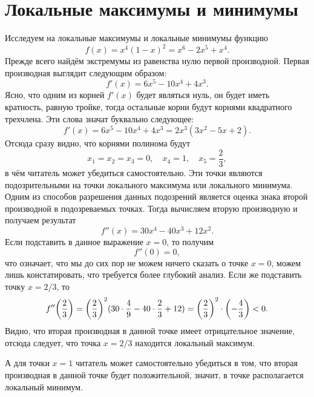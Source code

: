 \documentclass[12pt]{article}
\begin{document}
\section{Локальные максимумы и минимумы} %
\label{sec:6}
Исследуем на локальные максимумы и локальные минимумы функцию 
\begin{equation}
	f(x) = x^4(1-x)^2 = x^6-2x^5+x^4.
\end{equation}
Прежде всего найдём экстремумы из равенства нулю первой производной. Первая производная выглядит следующим образом:
\begin{equation}
	f'(x) = 6x^5 -10x^4+4x^3.
\end{equation}
Ясно, что одним из корней $f'(x)$ будет являться нуль, он будет иметь кратность, равную тройке, тогда остальные корни будут корнями квадратного трехчлена. Эти слова значат буквально следующее:
\begin{equation}
	f'(x) = 6x^5 -10x^4+4x^3 = 2x^3(3x^2 - 5x + 2).
\end{equation}
Отсюда сразу видно, что корнями полинома будут
\begin{equation}
	x_1 = x_2 = x_3 = 0,\quad x_4 = 1, \quad x_5 = \dfrac{2}{3},
\end{equation}
в чём читатель может убедиться самостоятельно. Эти точки являются подозрительными на точки локального максимума или локального минимума. Одним из способов разрешения данных подозрений является оценка знака второй производной в подозреваемых точках. Тогда вычисляем вторую производную и получаем результат
\begin{equation}
	f''(x) = 30 x^4 -40x^3+12x^2. 
\end{equation}
Если подставить в данное выражение $x=0$, то получим 
\begin{equation}
	f''(0) = 0,
\end{equation}
что означает, что мы до сих пор не можем ничего сказать о точке $x=0$, можем лишь констатировать, что требуется более глубокий анализ. Если же подставить точку $x=2/3$, то 
\begin{equation}
	f''\qty(\dfrac{2}{3}) = \qty(\dfrac{2}{3})^2(30 \cdot \dfrac{4}{9} - 40 \cdot \dfrac{2}{3} + 12) = \qty(\dfrac{2}{3})^2 \cdot \qty(-\dfrac{4}{3}) < 0.
\end{equation}
Видно, что вторая производная в данной точке имеет отрицательное значение, отсюда следует, что точка $x=2/3$ находится локальный максимум.

А для точки $x=1$ читатель может самостоятельно убедиться в том, что вторая производная в данной точке будет положительной, значит, в точке располагается локальный минимум.
\end{document}
